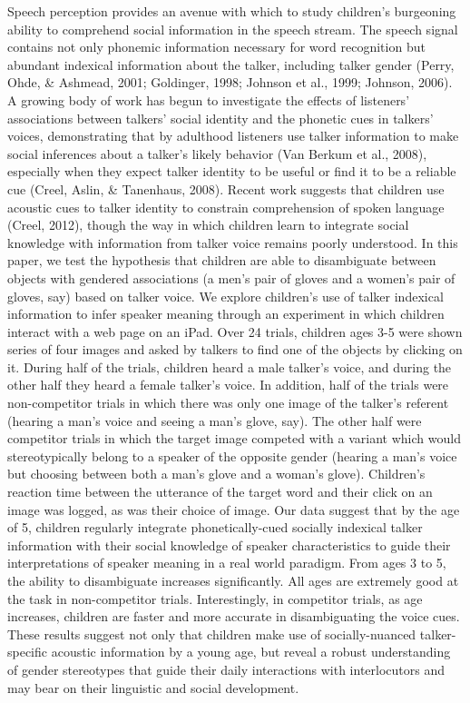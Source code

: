 \documentclass[12pt, oneside]{article}   	%
\begin{document}
Speech perception provides an avenue with which to study children's burgeoning ability to comprehend social information in the speech stream. The speech signal contains not only phonemic information necessary for word recognition but abundant indexical information about the talker, including talker gender (Perry, Ohde, \& Ashmead, 2001; Goldinger, 1998; Johnson et al., 1999; Johnson, 2006). A growing body of work has begun to investigate the effects of listeners' associations between talkers' social identity and the phonetic cues in talkers' voices, demonstrating that by adulthood listeners use talker information to make social inferences about a talker's likely behavior (Van Berkum et al., 2008), especially when they expect talker identity to be useful or find it to be a reliable cue (Creel, Aslin, \& Tanenhaus, 2008). Recent work suggests that children use acoustic cues to talker identity to constrain
comprehension of spoken language (Creel, 2012), though the way in which children learn to integrate social knowledge with information from talker voice remains poorly understood. In this paper, we test the hypothesis that
children are able to disambiguate between objects with gendered associations (a men's pair of gloves and a women's pair of gloves, say) based on talker voice. We explore children's use of talker indexical information to infer speaker meaning through an experiment in which children interact with a web page on an iPad. Over 24 trials, children ages 3-5 were shown series of four images and asked by talkers to find one of the objects by clicking on it. During half of the trials, children heard a male talker's voice, and during the other half they heard a female talker's voice. In addition, half of the trials were non-competitor trials in which there was only one image of the talker's referent (hearing a man's voice and seeing a man's glove, say). The other half were competitor trials in which the target image competed with a variant which would stereotypically belong to a speaker of the opposite gender (hearing a man's voice but choosing between both a man's glove and a woman's glove). Children's reaction time between the utterance of the target word and their click on an image was logged, as was their choice of image. Our data suggest that by the age of 5, children regularly integrate phonetically-cued socially indexical talker information with their social knowledge of speaker characteristics to guide their interpretations of speaker meaning in a real world paradigm. From ages 3 to 5, the ability to disambiguate increases significantly. All ages are extremely good at the task in non-competitor trials. Interestingly, in competitor trials, as age increases, children are faster and more accurate in disambiguating the voice cues. These results suggest not only that children make use of socially-nuanced talker-specific acoustic information by a young age, but reveal a robust understanding of gender stereotypes that guide their daily interactions with interlocutors and may bear on their linguistic and social development.
\end{document}
